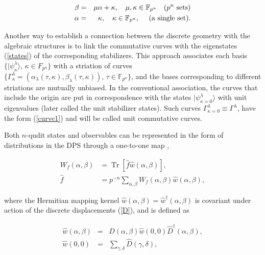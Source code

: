 \documentclass[quantumrep,article,submit,pdftex,moreauthors]{Definitions/mdpi}
\DeclareMathOperator{\Tr}{Tr}
\begin{document}
\begin{eqnarray}
  \beta
  &=& \mu \alpha + \kappa, \quad \mu, \kappa \in \mathbb{F}_{p^{n}}
  \quad \text{($p^{n}$ sets)}
  \label{rays0} \\
  \alpha
  &=& \kappa, \quad \kappa \in \mathbb{F}_{p^{n}},
  \quad \text{ (a single set).}
  \notag
\end{eqnarray}

Another way to establish a connection between the discrete geometry with the
algebraic structures is to link the commutative curves with the eigenstates
(\ref{states}) of the corresponding stabilizers. This approach associates each
basis $\{|\psi_{\kappa}^{\lambda}\rangle $, $\kappa \in F_{p^{n}}\}$ with a
striation of curves $\{\Gamma_{\kappa}^{\lambda} = \left(
\alpha_{\lambda}(\tau,\kappa),\beta_{\lambda}(\tau,\kappa)\right) ,\,\tau \in
\mathbb{F}_{p^{n}}\}$, and the bases corresponding to different striations are
mutually unbiased. In the conventional association, the curves that include the
origin are put in correspondence with the states $|\psi_{\kappa =
0}^{\lambda}\rangle $ with unit eigenvalues (later called the unit stabilizer
states). Such curves $\Gamma_{\kappa=0}^{\lambda} \equiv \Gamma^{\lambda}$,
have the form (\ref{curve1}) and will be called unit commutative curves. 

Both $n$-qudit states and observables can be represented in the form of
distributions in the DPS through a one-to-one map
\cite{gross,DFW2-1,DFW2-2,DFW2-3,DFW2-4},

\begin{align}
  W_{f}\left( \alpha,\beta \right)
  &= \Tr\left[ \hat{f}\hat{w}\left( \alpha,\beta \right) \right],
  \label{map} \\
  \hat{f}
  &= p^{-n}\sum_{\alpha,\beta } W_{f}(\alpha,\beta) \hat{w}(\alpha,\beta),
\end{align}

where the Hermitian mapping kernel $\hat{w}\left( \alpha,\beta \right) =
\hat{w}^{\dagger}(\alpha,\beta)$ is covariant under action of the discrete
displacements (\ref{D}), and is defined as

\begin{eqnarray}
  \hat{w}\left( \alpha,\beta \right)
  &=& \hat{D}\left( \alpha,\beta \right) 
  \hat{w}\left( 0,0\right) \hat{D}^{\dagger}\left( \alpha,\beta \right) ,
  \label{Ds} \\
  \hat{w}\left( 0,0\right)
  &=& \sum_{\gamma,\delta}\hat{D}(\gamma,\delta),
  \label{Dw0}
\end{eqnarray}
\end{document}
